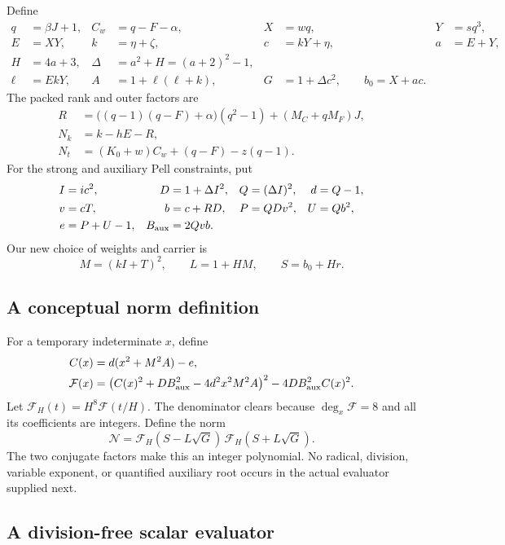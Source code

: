 \documentclass[11pt,a4paper]{article}
\theoremstyle{remark}\newtheorem{remark}[theorem]{Remark}
\begin{document}
Define
\begin{align*}
 q&=\beta J+1,& C_w&=q-F-\alpha,& X&=wq,&Y&=sq^3,\\
 E&=XY,&k&=\eta+\zeta,&c&=kY+\eta,&a&=E+Y,\\
 H&=4a+3,&\Delta&=a^2+H=(a+2)^2-1,\\
 \ell&=EkY,&A&=1+\ell(\ell+k),&G&=1+\Delta c^2,\qquad b_0=X+ac.
\end{align*}
The packed rank and outer factors are
\begin{align}
 R&=\bigl((q-1)(q-F)+\alpha\bigr)(q^2-1)
                    +(M_C+qM_F)J,\label{eq:R}\\
 N_k&=k-hE-R,\label{eq:Nk}\\
 N_t&=(K_0+w)C_w+(q-F)-z(q-1).\label{eq:Nt}
\end{align}
For the strong and auxiliary Pell constraints, put
\begin{align*}
 I&=ic^2,&D&=1+\Delta I^2,&Q&=(\Delta I)^2,&d&=Q-1,\\
 v&=cT,&b&=c+RD,&P&=QDv^2,&U&=Qb^2,\\
 e&=P+U-1,& B_{\rm aux}&=2Qvb.
\end{align*}
Our new choice of weights and carrier is
\begin{equation}
 \boxed{M=(kI+T)^2,\qquad L=1+HM,\qquad S=b_0+Hr.}
 \label{eq:weights}
\end{equation}

\subsection{A conceptual norm definition}

For a temporary indeterminate $x$, define
\begin{align*}
 C(x)&=d(x^2+M^2A)-e,\\
 \mathcal F(x)&=
  \bigl(C(x)^2+DB_{\rm aux}^2-4d^2x^2M^2A\bigr)^2
            -4DB_{\rm aux}^2C(x)^2.
\end{align*}
Let $\mathcal F_H(t)=H^8\mathcal F(t/H)$.
The denominator clears because $\deg_x\mathcal F=8$ and all its
coefficients are integers. Define the norm
\begin{equation}
 \mathcal N=\mathcal F_H(S-L\sqrt G)\,
             \mathcal F_H(S+L\sqrt G).
 \label{eq:norm}
\end{equation}
The two conjugate factors make this an integer polynomial. No radical,
division, variable exponent, or quantified auxiliary root occurs in the
actual evaluator supplied next.

\subsection{A division-free scalar evaluator}
\end{document}
